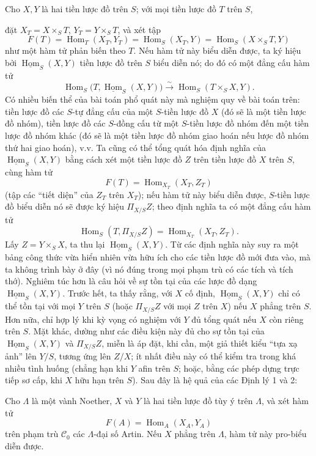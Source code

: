 Cho $X,Y$ là hai tiền lược đồ trên $S$; với mọi tiền lược đồ $T$ trên $S$,

đặt $X_T=X\times_ST$, $Y_T=Y\times_ST$, và xét tập
\[
  F(T)=\operatorname{Hom}_T(X_T,Y_T)
      =\operatorname{Hom}_S(X_T,Y)
      =\operatorname{Hom}_S(X\times_ST,Y)
\]
như một hàm tử phản biến theo $T$. Nếu hàm tử này biểu diễn được, ta ký hiệu
bởi $\underline{\operatorname{Hom}}_S(X,Y)$ tiền lược đồ trên $S$ biểu diễn
nó; do đó có một đẳng cấu hàm tử
\[
  \operatorname{Hom}_S
  \bigl(T,\underline{\operatorname{Hom}}_S(X,Y)\bigr)
  \xrightarrow{\sim}
  \operatorname{Hom}_S(T\times_SX,Y).
\]
Có nhiều biến thể của bài toán phổ quát này mà nghiệm quy về bài toán trên:
tiền lược đồ các $S$-tự đẳng cấu của một $S$-tiền lược đồ $X$ (đó sẽ là một
tiền lược đồ nhóm), tiền lược đồ các $S$-đồng cấu từ một $S$-tiền lược đồ nhóm
đến một tiền lược đồ nhóm khác (đó sẽ là một tiền lược đồ nhóm giao hoán nếu
lược đồ nhóm thứ hai giao hoán), v.v. Ta cũng có thể tổng quát hóa định nghĩa
của $\underline{\operatorname{Hom}}_S(X,Y)$ bằng cách xét một tiền lược đồ $Z$
trên tiền lược đồ $X$ trên $S$, cùng hàm tử
\[
  F(T)=\operatorname{Hom}_{X_T}(X_T,Z_T)
\]
(tập các ``tiết diện'' của $Z_T$ trên $X_T$); nếu hàm tử này biểu diễn được,
$S$-tiền lược đồ biểu diễn nó sẽ được ký hiệu $\Pi_{X/S}Z$; theo định nghĩa ta
có một đẳng cấu hàm tử
\[
  \operatorname{Hom}_S(T,\Pi_{X/S}Z)
  =\operatorname{Hom}_{X_T}(X_T,Z_T).
\]
Lấy $Z=Y\times_SX$, ta thu lại
$\underline{\operatorname{Hom}}_S(X,Y)$. Từ các định nghĩa này suy ra một bảng
công thức vừa hiển nhiên vừa hữu ích cho các tiền lược đồ mới đưa vào, mà ta
không trình bày ở đây (vì nó đúng trong mọi phạm trù có các tích và tích thớ).
Nghiêm túc hơn là câu hỏi về sự tồn tại của các lược đồ dạng
$\underline{\operatorname{Hom}}_S(X,Y)$. Trước hết, ta thấy rằng, với $X$ cố
định, $\underline{\operatorname{Hom}}_S(X,Y)$ chỉ có thể tồn tại với mọi $Y$
trên $S$ (hoặc $\Pi_{X/S}Z$ với mọi $Z$ trên $X$) nếu $X$ phẳng trên $S$.
Hơn nữa, chỉ hợp lý khi kỳ vọng có nghiệm với $Y$ đủ tổng quát nếu $X$ còn
riêng trên $S$. Mặt khác, dường như các điều kiện này đủ cho sự tồn tại của
$\underline{\operatorname{Hom}}_S(X,Y)$ và $\Pi_{X/S}Z$, miễn là áp đặt, khi
cần, một giả thiết kiểu ``tựa xạ ảnh'' lên $Y/S$, tương ứng lên $Z/X$; ít nhất
điều này có thể kiểm tra trong khá nhiều tình huống (chẳng hạn khi $Y$ afin
trên $S$; hoặc, bằng các phép dựng trực tiếp sơ cấp, khi $X$ hữu hạn trên $S$).
Sau đây là hệ quả của các Định lý 1 và 2:

 Cho $\Lambda$ là một vành Noether, $X$ và $Y$ là hai
tiền lược đồ tùy ý trên $\Lambda$, và xét hàm tử
\[
  F(A)=\operatorname{Hom}_A(X_A,Y_A)
\]
trên phạm trù $\mathcal C_0$ các $\Lambda$-đại số Artin. Nếu $X$ phẳng trên
$\Lambda$, hàm tử này pro-biểu diễn được.

